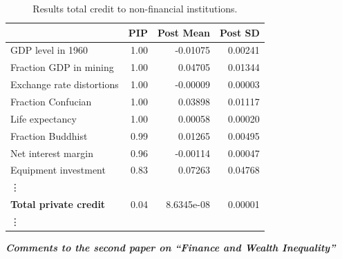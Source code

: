 \begin{table}[ht!]
  \caption{Results total credit to non-financial institutions.}\label{chA:tab1}
    \footnotesize
    \centering
  \begin{tabular}{lrrr}
    \toprule
                                 & PIP & Post Mean & Post SD \\
    \midrule
    GDP level in 1960 & 1.00 & -0.01075 & 0.00241 \\
    Fraction GDP in mining & 1.00 & 0.04705 & 0.01344 \\
    Exchange rate distortions & 1.00 & -0.00009 & 0.00003 \\ 
    Fraction Confucian & 1.00 & 0.03898 & 0.01117 \\
    Life expectancy & 1.00 & 0.00058 & 0.00020 \\
    Fraction Buddhist & 0.99 & 0.01265 & 0.00495 \\ 
    Net interest margin & 0.96 & -0.00114 & 0.00047 \\ 
    Equipment investment & 0.83 & 0.07263 & 0.04768 \\
    \vdots \\
    \textbf{Total private credit} & 0.04 & 8.6345e-08 & 0.00001 \\
    \vdots \\
    \bottomrule
  \end{tabular}
\end{table}

\clearpage
\noindent \textbf{\textit{Comments to the second paper on ``Finance and Wealth Inequality''}}

